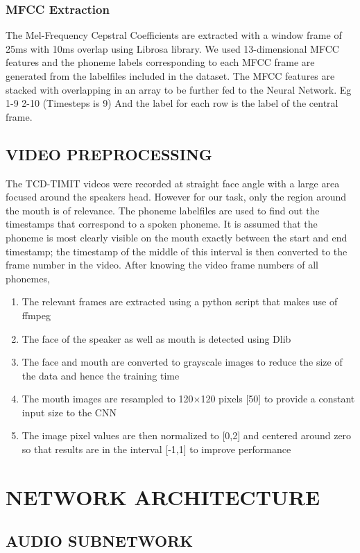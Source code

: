\documentclass{article}
\begin{document}
\subsubsection{MFCC Extraction}
The Mel-Frequency Cepstral Coefficients are extracted with a window frame of 25ms with 10ms overlap using Librosa library. We used 13-dimensional MFCC features and the phoneme labels corresponding to each MFCC frame are generated from the labelfiles included in the dataset.
The MFCC features are stacked with overlapping in an array to be further fed to the Neural Network. Eg 1-9 2-10 (Timesteps is 9) And the label for each row is the label of the central frame. 


\subsection{VIDEO PREPROCESSING}
The TCD-TIMIT videos were recorded at straight face angle with a large area focused around the speakers head. However for our task, only the region around the mouth is of relevance\cite{Mouthshapes}. The phoneme labelfiles are used to find out the timestamps that correspond to a spoken phoneme. It is assumed that the phoneme is most clearly visible on the mouth exactly between the start and end timestamp; the timestamp of the middle of this interval is then converted to the frame number in the video. After knowing the video frame numbers of all phonemes, \cite{Thesis}
\begin{enumerate}
\item The relevant frames are extracted using a python script that makes use of ffmpeg\cite{CNNFeatures}
\item The face of the speaker as well as mouth is detected using Dlib\cite{Dlib}
\item The face and mouth are converted to grayscale images to reduce the size of the data and hence the training time
\item The mouth images are resampled to 120$\times$120 pixels [50] to provide a constant input size to the CNN
\item The image pixel values are then normalized to [0,2] and centered around zero so that results are in the interval [-1,1] to improve performance
\end{enumerate}

\section{NETWORK ARCHITECTURE}
\subsection{AUDIO SUBNETWORK}
\end{document}
